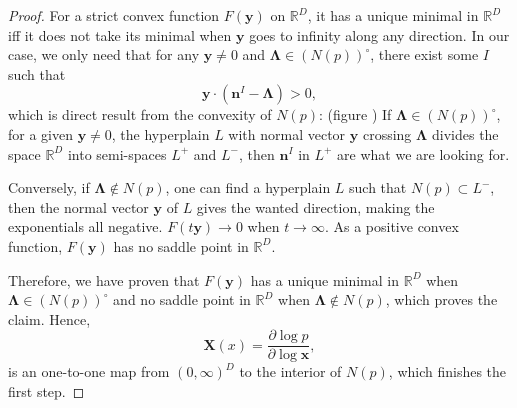 \documentclass[12pt]{article}
\theoremstyle{definition}
\theoremstyle{plain}
\begin{document}
\begin{proof}
For a strict convex function $F(\mathbf y)$ on $\mathbb R^D$, it has a unique minimal in $\mathbb R^D$ iff it does not take its minimal when $\mathbf{y}$ goes to infinity along any direction. In our case, we only need that for any $\mathbf{y}\neq 0$ and $\mathbf\Lambda \in (N(p))^\circ $, there exist some $I$ such that  
\[
	\mathbf{y}\cdot (\mathbf{n}^I-\mathbf{\Lambda})>0,
\]
which is direct result from the convexity of $N(p)$: (figure \cite{}) If $\mathbf\Lambda \in (N(p))^\circ$, for a given $\mathbf y\neq 0$, the hyperplain $L$ with normal vector $\mathbf y$ crossing $\mathbf \Lambda$ divides the space $\mathbb R^D$ into semi-spaces $L^+$ and $L^-$, then $\mathbf{n}^I$ in $L^+$ are what we are looking for.

\begin{figure}[htbp]
\centering
{}
\end{figure}
Conversely, if $\mathbf\Lambda \not\in N(p)$, one can find a hyperplain $L$ such that $N(p)\subset L^-$, then the normal vector $\mathbf{y}$ of $L$ gives the wanted direction, making the exponentials all negative. $F(t\mathbf y)\to 0$ when $t\to \infty$. As a positive convex function, $F(\mathbf y)$ has no saddle point in $\mathbb R^D$.

Therefore, we have proven that $F(\mathbf y)$ has a unique minimal in $\mathbb R^D$ when $\mathbf \Lambda \in (N(p))^\circ$ and no saddle point in $\mathbb R^D$ when $\mathbf \Lambda \not\in N(p)$, which proves the claim. Hence, 
\[
	\mathbf X(x)=\frac{\partial \log p}{\partial \log \mathbf x},
\]
is an one-to-one map from $(0,\infty)^D$ to the interior of $N(p)$, which finishes the first step.


\end{proof}
\end{document}
